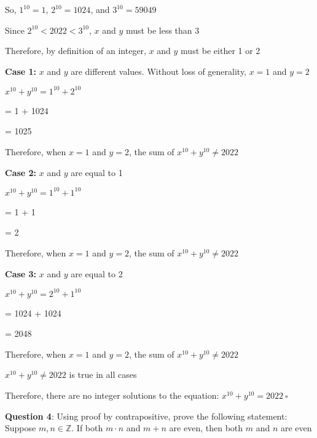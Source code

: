 \documentclass{article} %
\newcommand{\question}[2][]{\begin{flushleft}
        \textbf{Question #1}: #2
\end{flushleft}}
\begin{document}
    So, $1^{10} = 1$, $2^{10} = 1024$, and $3^{10} = 59049$

    Since $2^{10} < 2022 < 3^{10}$, $x$ and $y$ must be less than $3$

    Therefore, by definition of an integer, $x$ and $y$ must be either 1 or 2

    \vspace*{0.1cm}

    \textbf{Case 1:} $x$ and $y$ are different values. Without loss of generality, $x = 1$ and $y = 2$
    
    $x^{10} + y^{10} = 1^{10} + 2^{10}$

    \tabto{2.02cm} = 1 + 1024

    \tabto{2.02cm} = 1025

    Therefore, when $x = 1$ and $y = 2$, the sum of $x^{10} + y^{10} \neq 2022$ 

    \textbf{Case 2:} $x$ and $y$ are equal to 1

    $x^{10} + y^{10} = 1^{10} + 1^{10}$

    \tabto{2.02cm} = 1 + 1

    \tabto{2.02cm} = 2

    Therefore, when $x = 1$ and $y = 2$, the sum of $x^{10} + y^{10} \neq 2022$ 

    \textbf{Case 3:} $x$ and $y$ are equal to 2

    $x^{10} + y^{10} = 2^{10} + 1^{10}$

    \tabto{2.02cm} = 1024 + 1024

    \tabto{2.02cm} = 2048

    Therefore, when $x = 1$ and $y = 2$, the sum of $x^{10} + y^{10} \neq 2022$ 

    \vspace*{0.1cm}

    $x^{10} + y^{10} \neq 2022$ is true in all cases
    
    Therefore, there are no integer solutions to the equation: $x^{10} + y^{10} = 2022\ \square$

    \newpage


    \question[4]{Using proof by contrapositive, prove the following statement: Suppose $m, n \in \mathbb{Z}.$ If both $m \cdot n$ and $m+n$ are even, then 
    both $m$ and $n$ are even}
\end{document}
